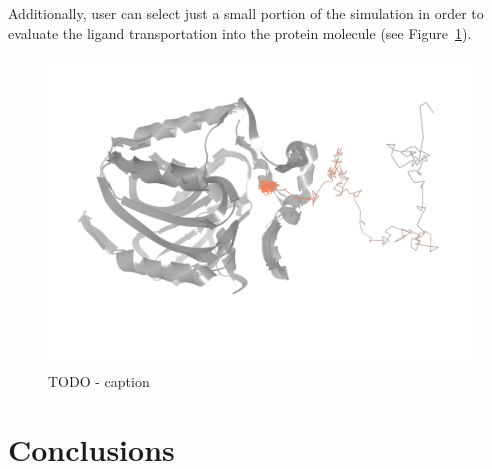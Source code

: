 \documentclass[twocolumn]{bmcart}%
\begin{document}
Additionally, user can select just a small portion of the simulation in order to evaluate the ligand transportation into the protein molecule (see Figure~\ref{fig:path}).

\begin{figure}[htb]
	\centering
	\includegraphics[width=0.95\linewidth]{img/path.png}
  \caption{
  \label{fig:path}
  TODO - caption
  }
\end{figure}  




\section*{Conclusions}


\end{document}
